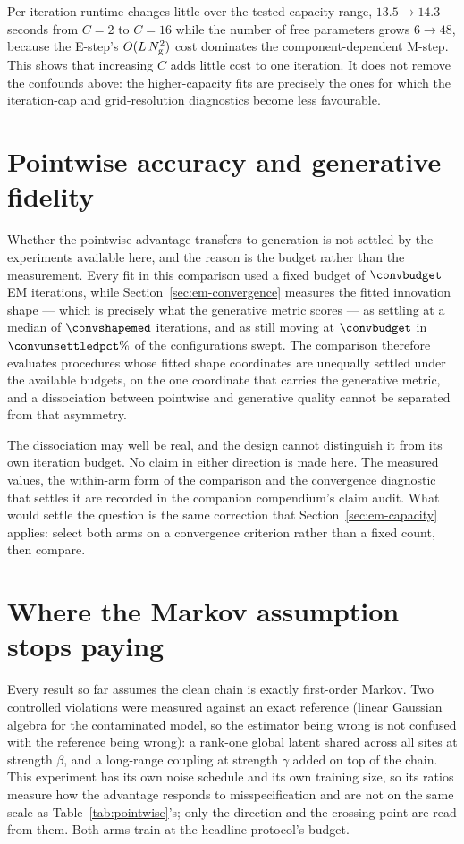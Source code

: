 Per-iteration runtime changes little over the tested capacity range,
$13.5\to14.3$ seconds from $C=2$ to $C=16$ while the number of free parameters
grows $6\to48$, because the E-step's $O(L\,N_{\mathrm{g}}^2)$ cost dominates the
component-dependent M-step. This shows that increasing $C$ adds little cost to
one iteration. It does not remove the confounds above: the higher-capacity fits
are precisely the ones for which the iteration-cap and grid-resolution
diagnostics become less favourable.

\section{Pointwise accuracy and generative fidelity}
\label{sec:em-generative}

Whether the pointwise advantage transfers to generation is not settled by
the experiments available here, and the reason is the budget rather than the
measurement. Every fit in this comparison used a fixed budget of $\convbudget$ EM
iterations, while Section~\ref{sec:em-convergence} measures the fitted
innovation shape --- which is precisely what the generative metric scores --- as
settling at a median of $\convshapemed$ iterations, and as still moving at
$\convbudget$ in $\convunsettledpct\%$ of the configurations swept. The
comparison therefore evaluates procedures whose fitted shape coordinates are
unequally settled under the available budgets, on the one coordinate that
carries the generative metric, and a dissociation between pointwise and
generative quality cannot be separated from that asymmetry.

The dissociation may well be real, and the design cannot distinguish it from
its own iteration budget. No claim in either direction is made here. The
measured values, the within-arm form of the comparison and the convergence
diagnostic that settles it are recorded in the companion compendium's claim
audit. What would settle the question is the same correction that
Section~\ref{sec:em-capacity} applies: select both arms on a convergence
criterion rather than a fixed count, then compare.

\section{Where the Markov assumption stops paying}\label{sec:em-nonmarkov}

Every result so far assumes the clean chain is exactly first-order Markov.
Two controlled violations were measured against an exact reference (linear
Gaussian algebra for the contaminated model, so the estimator being wrong is
not confused with the reference being wrong): a rank-one global latent
shared across all sites at strength $\beta$, and a long-range coupling at
strength $\gamma$ added on top of the chain. This experiment has its own noise
schedule and its own training size, so its ratios measure how the advantage
responds to misspecification and are not on the same scale as
Table~\ref{tab:pointwise}'s; only the direction and the crossing point are read
from them. Both arms train at the headline protocol's budget.

